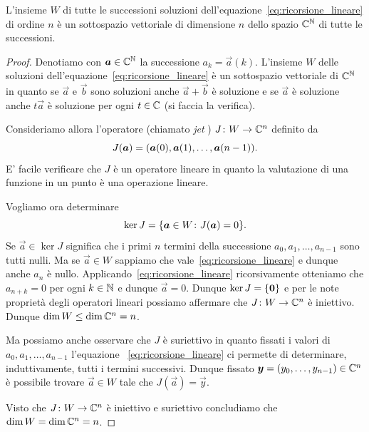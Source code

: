\begin{theorem}
\label{th:dimensione_ricorsione_lineare}
L'insieme $W$ di tutte le successioni soluzioni dell'equazione~\eqref{eq:ricorsione_lineare}
di ordine $n$
è un sottospazio vettoriale di dimensione $n$
dello spazio ${\mathbb C}^{\mathbb N}$ di tutte le successioni.
\end{theorem}
%
\begin{proof}
Denotiamo con $\boldsymbol a \in {\mathbb C}^{\mathbb N}$ la successione $a_k = \vec a(k)$.
L'insieme $W$ delle soluzioni dell'equazione~\eqref{eq:ricorsione_lineare}
è un sottospazio vettoriale di ${\mathbb C}^{\mathbb N}$ in quanto se $\vec a$
e $\vec b$ sono soluzioni anche $\vec a + \vec b$ è soluzione e se $\vec a$
è soluzione anche $t \vec a$ è soluzione per ogni $t\in {\mathbb C}$
(si faccia la verifica).

Consideriamo allora l'operatore (chiamato \emph{jet}%
) $J\colon W \to {\mathbb C}^n$
definito da
\[
  J(\boldsymbol a) = {\left( \boldsymbol a(0), \boldsymbol a(1), \dots, \boldsymbol a(n-1) \right)}.
\]
E' facile verificare che $J$ è un operatore lineare in quanto la valutazione
di una funzione in un punto è una operazione lineare.

Vogliamo ora determinare
\[
  \ker J = {\left\{ \boldsymbol a \in W \colon J(\boldsymbol a)=0 \right\}}.
\]
Se $\vec a\in \ker J$ significa che i primi $n$ termini
della successione
$a_0, a_1, \dots, a_{n-1}$ sono tutti nulli.
Ma se $\vec a\in W$ sappiamo che vale~\eqref{eq:ricorsione_lineare} e dunque
anche $a_n$ è nullo. Applicando~\eqref{eq:ricorsione_lineare} ricorsivamente
otteniamo che $a_{n+k}=0$ per ogni $k\in {\mathbb N}$ e dunque $\vec a = 0$.
Dunque $\ker J = {\left\{ \boldsymbol 0 \right\}}$
e per le note proprietà degli operatori lineari possiamo
affermare che $J\colon W \to {\mathbb C}^n$ è iniettivo.
Dunque $\dim W \le \dim {\mathbb C}^n = n$.

Ma possiamo anche osservare che $J$ è suriettivo in quanto
fissati i valori di $a_0,a_1, \dots, a_{n-1}$ l'equazione
~\eqref{eq:ricorsione_lineare} ci permette di determinare,
induttivamente, tutti i termini successivi. Dunque
fissato $\boldsymbol y = (y_0, \dots, y_{n-1}) \in {\mathbb C}^n$
è possibile trovare $\vec a \in W$ tale che $J(\vec a) = \vec y$.

Visto che $J\colon W\to{\mathbb C}^n$ è iniettivo e suriettivo
concludiamo che $\dim W = \dim {\mathbb C}^n = n$.
\end{proof}

